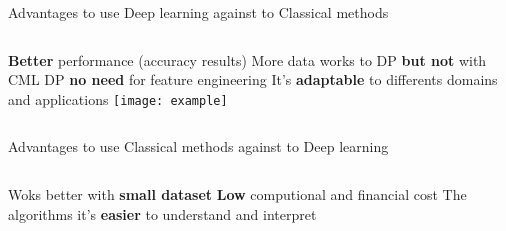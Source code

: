\begin{frame}[t]{Advantages to use Deep learning against to Classical methods} 
        \begin{columns}[c]
                \newline
                \newline
                \textbf{Better} performance (accuracy results)
                \newline
                \newline
                More data works to DP \textbf{but not} with CML
                \newline
                \newline
                DP \textbf{no need} for feature engineering
                \newline
                \newline
                It's \textbf{adaptable} to differents domains and applications
                \newline
                \newline
                        \texttt{[image: example]}
        \end{columns}
       
\end{frame}


\begin{frame}[t]{Advantages to use Classical methods against to  Deep learning} 
        \begin{columns}[c]
                \newline
                \newline
                Woks better with \textbf{small dataset}
                \newline
                \newline
                \textbf{Low} computional and financial cost
                \newline
                \newline
                The algorithms it's \textbf{easier} to understand and interpret
                \newline
                \newline
        \end{columns}
       
\end{frame}